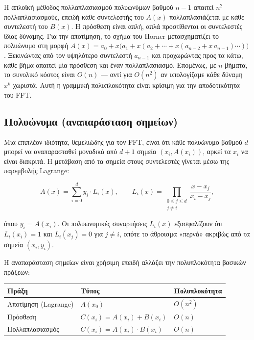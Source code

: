 \documentclass[a4paper, 11pt]{article}
\begin{document}
Η απλοϊκή μέθοδος πολλαπλασιασμού πολυωνύμων βαθμού \(n-1\) απαιτεί
\(n^2\) πολλαπλασιασμούς, επειδή κάθε συντελεστής του \(A(x)\)
πολλαπλασιάζεται με κάθε συντελεστή του \(B(x)\). Η πρόσθεση είναι απλή,
απλά προστίθενται οι συντελεστές ίδιας δύναμης. Για την αποτίμηση, το
σχήμα του Horner μετασχηματίζει το πολυώνυμο στη μορφή
\(A(x) = a_0 + x\bigl(a_1 + x(a_2 + \cdots + x(a_{n-2} + x\,a_{n-1})\cdots)\bigr)\).
Ξεκινώντας από τον υψηλότερο συντελεστή \(a_{n-1}\) και προχωρώντας προς
τα κάτω, κάθε βήμα απαιτεί μία πρόσθεση και έναν πολλαπλασιασμό.
Επομένως, με \(n\) βήματα, το συνολικό κόστος είναι \(O(n)\) --- αντί
για \(O(n^2)\) αν υπολογίζαμε κάθε δύναμη \(x^k\) χωριστά. Αυτή η
γραμμική πολυπλοκότητα είναι κρίσιμη για την αποδοτικότητα του FFT.

\subsection{Πολυώνυμα (αναπαράσταση
σημείων)}\label{ux3c0ux3bfux3bbux3c5ux3ceux3bdux3c5ux3bcux3b1-ux3b1ux3bdux3b1ux3c0ux3b1ux3c1ux3acux3c3ux3c4ux3b1ux3c3ux3b7-ux3c3ux3b7ux3bcux3b5ux3afux3c9ux3bd}

Μια επιπλέον ιδιότητα, θεμελιώδης για τον FFT, είναι ότι κάθε πολυώνυμο
βαθμού \(d\) μπορεί να αναπαρασταθεί μοναδικά από \(d+1\) σημεία
\((x_i, A(x_i))\), αρκεί τα \(x_i\) να είναι διακριτά. Η μετάβαση από τα
σημεία στους συντελεστές γίνεται μέσω της παρεμβολής Lagrange:

\[
A(x) = \sum_{i=0}^{d} y_i \cdot L_i(x), \qquad
L_i(x) = \prod_{\substack{0 \le j \le d \\ j \ne i}} \frac{x - x_j}{x_i - x_j},
\]

όπου \(y_i = A(x_i)\). Οι πολυωνυμικές συναρτήσεις \(L_i(x)\)
εξασφαλίζουν ότι \(L_i(x_i)=1\) και \(L_i(x_j)=0\) για \(j \ne i\),
οπότε το άθροισμα «περνά» ακριβώς από τα σημεία \((x_i, y_i)\).

Η αναπαράσταση σημείων είναι χρήσιμη επειδή αλλάζει την πολυπλοκότητα
βασικών πράξεων:

\begin{longtable}[]{@{}lll@{}}
\toprule\noalign{}
Πράξη & Τύπος & Πολυπλοκότητα \\
\midrule\noalign{}
\endhead
\bottomrule\noalign{}
\endlastfoot
Αποτίμηση (Lagrange) & \(A(x_0)\) & \(O(n^2)\) \\
Πρόσθεση & \(C(x_i) = A(x_i) + B(x_i)\) & \(O(n)\) \\
Πολλαπλασιασμός & \(C(x_i) = A(x_i) \cdot B(x_i)\) & \(O(n)\) \\
\end{longtable}
\end{document}
